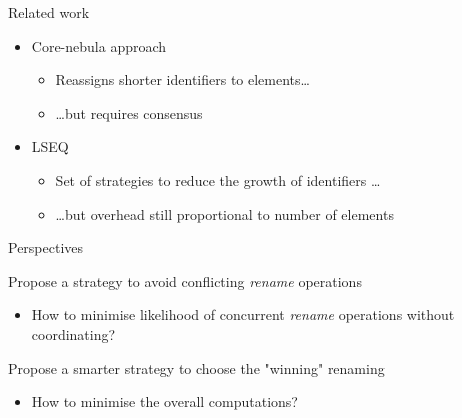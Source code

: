 \documentclass[10pt]{beamer}
\begin{document}
\begin{frame}{Related work}
  \begin{itemize}
    \item Core-nebula approach 
    \begin{itemize}
      \item Reassigns shorter identifiers to elements\dots
      \item \dots but requires consensus
    \end{itemize}
    \item LSEQ 
    \begin{itemize}
      \item Set of strategies to reduce the growth of identifiers \dots
      \item \dots but overhead still proportional to number of elements
    \end{itemize}
  \end{itemize}
\end{frame}

\begin{frame}{Perspectives}
  \begin{block}{Propose a strategy to avoid conflicting \emph{rename} operations}
    \begin{itemize}
      \item How to minimise likelihood of concurrent \emph{rename} operations without coordinating?
    \end{itemize}
  \end{block}

  \begin{block}{Propose a smarter strategy to choose the "winning" renaming}
    \begin{itemize}
      \item How to minimise the overall computations?
    \end{itemize}
  \end{block}
\end{frame}
\end{document}
